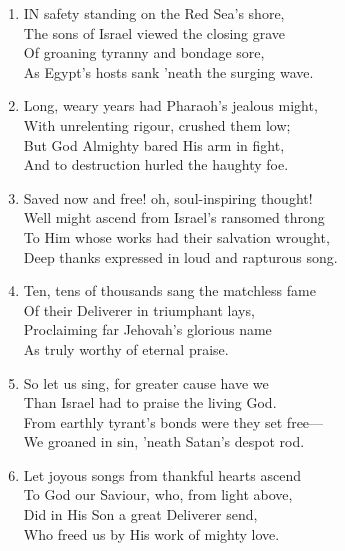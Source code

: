 \begin{enumerate}
    \item IN safety standing on the Red Sea's shore, \\
        The sons of Israel viewed the closing grave \\
        Of groaning tyranny and bondage sore, \\
        As Egypt's hosts sank 'neath the surging wave.

    \item Long, weary years had Pharaoh's jealous might, \\
        With unrelenting rigour, crushed them low; \\
        But God Almighty bared His arm in fight, \\
        And to destruction hurled the haughty foe.

    \item Saved now and free! oh, soul-inspiring thought! \\
        Well might ascend from Israel's ransomed throng \\
        To Him whose works had their salvation wrought, \\
        Deep thanks expressed in loud and rapturous song.

    \item Ten, tens of thousands sang the matchless fame \\
        Of their Deliverer in triumphant lays, \\
        Proclaiming far Jehovah's glorious name \\
        As truly worthy of eternal praise.

    \item So let us sing, for greater cause have we \\
        Than Israel had to praise the living God. \\
        From earthly tyrant's bonds were they set free--- \\
        We groaned in sin, 'neath Satan's despot rod.

    \item Let joyous songs from thankful hearts ascend \\
        To God our Saviour, who, from light above, \\
        Did in His Son a great Deliverer send, \\
        Who freed us by His work of mighty love.

\end{enumerate}

